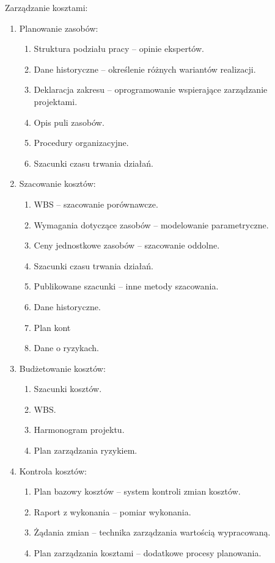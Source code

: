 Zarządzanie kosztami:
\begin{enumerate}
\item Planowanie zasobów:
\begin{enumerate}
\item Struktura podziału pracy – opinie ekspertów.
\item Dane historyczne – określenie różnych wariantów realizacji.
\item Deklaracja zakresu – oprogramowanie wspierające zarządzanie projektami.
\item Opis puli zasobów.
\item Procedury organizacyjne.
\item Szacunki czasu trwania działań.
\end{enumerate}

\item Szacowanie kosztów:
\begin{enumerate}

\item WBS – szacowanie porównawcze.
\item Wymagania dotyczące zasobów – modelowanie parametryczne.
\item Ceny jednostkowe zasobów – szacowanie oddolne.
\item Szacunki czasu trwania działań.
\item Publikowane szacunki – inne metody szacowania.
\item Dane historyczne.
\item Plan kont
\item Dane o ryzykach.

\end{enumerate}

\item Budżetowanie kosztów:

\begin{enumerate}

\item Szacunki kosztów.
\item WBS.
\item Harmonogram projektu.
\item Plan zarządzania ryzykiem.

\end{enumerate}

\item Kontrola kosztów:
\begin{enumerate}
\item Plan bazowy kosztów – system kontroli zmian kosztów.
\item Raport z wykonania – pomiar wykonania.
\item Żądania zmian – technika zarządzania wartością wypracowaną.
\item Plan zarządzania kosztami – dodatkowe procesy planowania.
\end{enumerate}
\end{enumerate}



